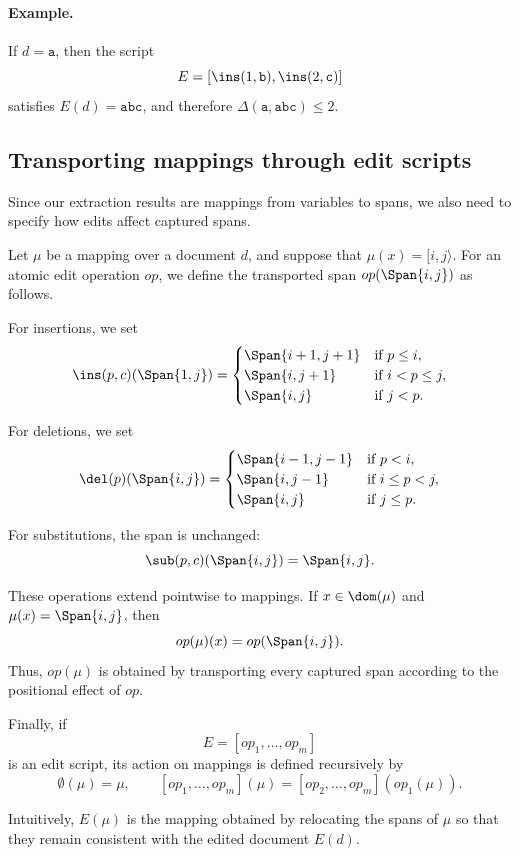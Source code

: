 \paragraph{Example.}
If $d=\mathtt{a}$, then the script
\[
E=[\ins(1,\mathtt{b}),\ins(2,\mathtt{c})]
\]
satisfies $E(d)=\mathtt{abc}$, and therefore $\Delta(\mathtt{a},\mathtt{abc}) \le 2$.

\subsection{Transporting mappings through edit scripts}

Since our extraction results are mappings from variables to spans, we also need to specify how edits affect captured spans.

Let $\mu$ be a mapping over a document $d$, and suppose that $\mu(x)=[i,j\rangle$. For an atomic edit operation $op$, we define the transported span $op(\Span{i,j})$ as follows.

For insertions, we set
\[
\ins(p,c)(\Span{1,j})=
\begin{cases}
	\Span{i+1,j+1} & \text{if } p \le i,\\
	\Span{i,j+1} & \text{if } i < p \le j,\\
	\Span{i,j} & \text{if } j < p.
\end{cases}
\]

For deletions, we set
\[
\del(p)(\Span{i,j})=
\begin{cases}
	\Span{i-1,j-1} & \text{if } p < i,\\
	\Span{i,j-1} & \text{if } i \le p < j,\\
	\Span{i,j} & \text{if } j \le p.
\end{cases}
\]

For substitutions, the span is unchanged:
\[
\sub(p,c)(\Span{i,j}) = \Span{i,j}.
\]

These operations extend pointwise to mappings. If $x \in \dom(\mu)$ and $\mu(x)=\Span{i,j}$, then
\[
op(\mu)(x) = op(\Span{i,j}).
\]
Thus, $op(\mu)$ is obtained by transporting every captured span according to the positional effect of $op$.

Finally, if
\[
E=[op_1,\dots,op_m]
\]
is an edit script, its action on mappings is defined recursively by
\[
\emptyset(\mu)=\mu,
\qquad
[op_1,\dots,op_m](\mu) = [op_2,\dots,op_m](op_1(\mu)).
\]

Intuitively, $E(\mu)$ is the mapping obtained by relocating the spans of $\mu$ so that they remain consistent with the edited document $E(d)$.

